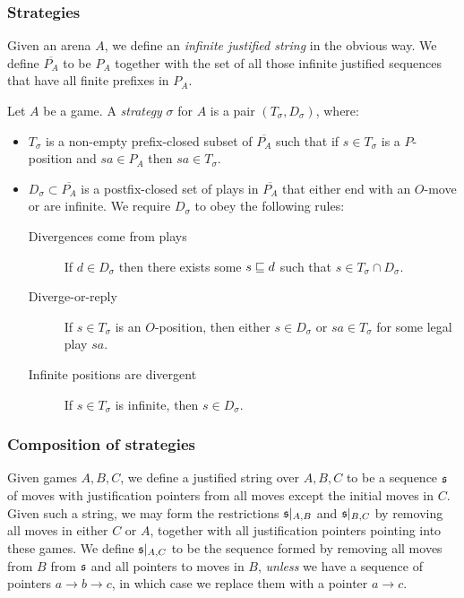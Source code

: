 \documentclass[sigplan,9pt,review]{acmart}\settopmatter{printfolios=true,printccs=false,printacmref=false}
\begin{document}
\subsubsection{Strategies}

Given an arena $A$, we define an \emph{infinite justified string} in the obvious way.  
We define $\overline{P_A}$ to be $P_A$ together with the set of all those infinite justified sequences that have all finite prefixes in $P_A$.

Let $A$ be a game.  
A \emph{strategy} $\sigma$ for $A$ is a pair $(T_\sigma,D_\sigma)$, where:
\begin{itemize}
  \item $T_\sigma$ is a non-empty prefix-closed subset of $\overline{P_A}$ such that if $s\in T_\sigma$ is a $P$-position and $sa\in P_A$ then $sa\in T_\sigma$.
  \item $D_\sigma\subset \overline{P_A}$ is a postfix-closed set of plays in $\overline{P_A}$ that either end with an $O$-move or are infinite.  
    We require $D_\sigma$ to obey the following rules:
    \begin{description}
      \item[Divergences come from plays] If $d\in D_\sigma$ then there exists some $s\sqsubseteq d$ such that $s\in T_\sigma\cap D_\sigma$.
      \item[Diverge-or-reply] If $s\in T_\sigma$ is an $O$-position, then either $s\in D_\sigma$ or $sa\in T_\sigma$ for some legal play $sa$.
      \item[Infinite positions are divergent] If $s\in T_\sigma$ is infinite, then $s\in D_\sigma$.
    \end{description}
\end{itemize}

\subsubsection{Composition of strategies}

Given games $A,B,C$, we define a justified string over $A,B,C$ to be a sequence $\mathfrak s$ of moves with justification pointers from all moves except the initial moves in $C$.  
Given such a string, we may form the restrictions $\mathfrak s\vert_{A,B}$ and $\mathfrak s\vert_{B,C}$ by removing all moves in either $C$ or $A$, together with all justification pointers pointing into these games.  
We define $\mathfrak s\vert_{A,C}$ to be the sequence formed by removing all moves from $B$ from $\mathfrak s$ and all pointers to moves in $B$, \emph{unless} we have a sequence of pointers $a \to b \to c$, in which case we replace them with a pointer $a \to c$.
\end{document}

